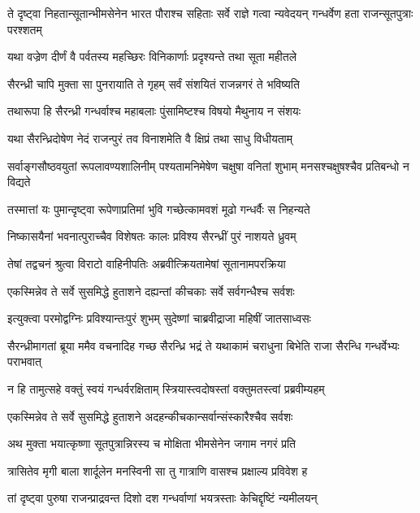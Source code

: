 \threelineshloka
{ते दृष्ट्वा निहतान्सूतान्भीमसेनेन भारत}
{पौराश्च सहिताः सर्वे राज्ञे गत्वा न्यवेदयन्}
{गन्धर्वेण हता राजन्सूतपुत्राः परश्शतम्}


\twolineshloka
{यथा वज्रेण दीर्णं वै पर्वतस्य महच्छिरः}
{विनिकार्णाः प्रदृश्यन्ते तथा सूता महीतले}


\twolineshloka
{सैरन्ध्री चापि मुक्ता सा पुनरायाति ते गृहम्}
{सर्वं संशयितं राजन्नगरं ते भविष्यति}


\twolineshloka
{तथारूपा हि सैरन्ध्री गन्धर्वाश्च महाबलाः}
{पुंसामिष्टश्च विषयो मैथुनाय न संशयः}


\twolineshloka
{यथा सैरन्ध्रिदोषेण नेदं राजन्पुरं तव}
{विनाशमेति वै क्षिप्रं तथा साधु विधीयताम्}


\threelineshloka
{सर्वाङ्गसौष्ठवयुतां रूपलावण्यशालिनीम्}
{पश्यतामनिमेषेण चक्षुषा वनितां शुभाम्}
{मनसश्चक्षुषश्चैव प्रतिबन्धो न विद्यते}


\twolineshloka
{तस्मात्तां यः पुमान्दृष्ट्वा रूपेणाप्रतिमां भुवि}
{गच्छेत्कामवशं मूढो गन्धर्वैः स निहन्यते}


\twolineshloka
{निष्कासयैनां भवनात्पुराच्चैव विशेषतः}
{कालः प्रविश्य सैरन्ध्रीं पुरं नाशयते ध्रुवम्}



\twolineshloka
{तेषां तद्वचनं श्रुत्वा विराटो वाहिनीपतिः}
{अब्रवीत्क्रियतामेषां सूतानामपरक्रिया}


\twolineshloka
{एकस्मिन्नेव ते सर्वे सुसमिद्धे हुताशने}
{दह्यन्तां कीचकाः सर्वे सर्वगन्धैश्च सर्वशः}


\twolineshloka
{इत्युक्त्वा परमोद्वग्निः प्रविश्यान्तःपुरं शुभम्}
{सुदेष्णां चाब्रवीद्राजा महिषीं जातसाध्वसः}


\threelineshloka
{सैरन्ध्रीमागतां ब्रूया ममैव वचनादिह}
{गच्छ सैरन्ध्रि भद्रं ते यथाकामं चराधुना}
{बिभेति राजा सैरन्धि गन्धर्वेभ्यः पराभवात्}


\twolineshloka
{न हि तामुत्सहे वक्तुं स्वयं गन्धर्वरक्षिताम्}
{स्त्रियास्त्वदोषस्तां वक्तुमतस्त्वां प्रब्रवीम्यहम्}



\twolineshloka
{एकस्मिन्नेव ते सर्वे सुसमिद्धे हुताशने}
{अदहन्कीचकान्सर्वान्संस्कारैश्चैव सर्वशः}


\twolineshloka
{अथ मुक्ता भयात्कृष्णा सूतपुत्रान्निरस्य च}
{मोक्षिता भीमसेनेन जगाम नगरं प्रति}


\twolineshloka
{त्रासितेव मृगी बाला शार्दूलेन मनस्विनी}
{सा तु गात्राणि वासश्च प्रक्षाल्य प्रविवेश ह}


\twolineshloka
{तां दृष्ट्वा पुरुषा राजन्प्राद्रवन्त दिशो दश}
{गन्धर्वाणां भयत्रस्ताः केचिद्दृष्टिं न्यमीलयन्}


